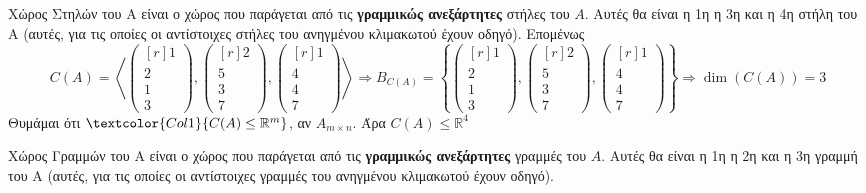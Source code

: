 \documentclass[a4paper,table]{report}
\begin{document}
\begin{myitemize}[leftmargin=*]
  \item \textcolor{Col1}{Χώρος Στηλών} του Α είναι ο χώρος που παράγεται 
    από τις \textbf{γραμμικώς ανεξάρτητες} \textcolor{Col1}{στήλες} του $A$. 
    Αυτές θα είναι η 1η η 3η και η 4η στήλη \textcolor{Col1}{του Α} 
    (αυτές, για τις οποίες οι αντίστοιχες στήλες του ανηγμένου κλιμακωτού έχουν οδηγό).
    Επομένως 
    \[
      C(A) = \left< 
      \begin{pmatrix*}[r] 1 \\ 2 \\ 1 \\ 3 \end{pmatrix*} , 
      \begin{pmatrix*}[r] 2 \\ 5 \\ 3 \\ 7 \end{pmatrix*} , 
      \begin{pmatrix*}[r] 1 \\ 4 \\ 4 \\ 7 \end{pmatrix*} \right> \Rightarrow 
      B_{C(A)} = \left\{  
        \begin{pmatrix*}[r] 1 \\ 2 \\ 1 \\ 3 \end{pmatrix*} , 
        \begin{pmatrix*}[r] 2 \\ 5 \\ 3 \\ 7 \end{pmatrix*} , 
      \begin{pmatrix*}[r] 1 \\ 4 \\ 4 \\ 7 \end{pmatrix*} \right\} \Rightarrow 
      \dim(C(A)) = 3
    \] 
    Θυμάμαι ότι $ \textcolor{Col1}{C(A) \leq \mathbb{R}^{m}} $, αν 
    $ A_{m\times n} $. Άρα $ C(A) \leq \mathbb{R}^{4} $
  \item \textcolor{Col1}{Χώρος Γραμμών} του Α είναι ο χώρος που παράγεται 
    από τις \textbf{γραμμικώς ανεξάρτητες} \textcolor{Col1}{γραμμές} του $A$. 
    Αυτές θα είναι η 1η η 2η και η 3η γραμμή \textcolor{Col1}{του Α} 
    (αυτές, για τις οποίες οι αντίστοιχες γραμμές του ανηγμένου κλιμακωτού έχουν οδηγό).

\end{myitemize}
\end{document}
